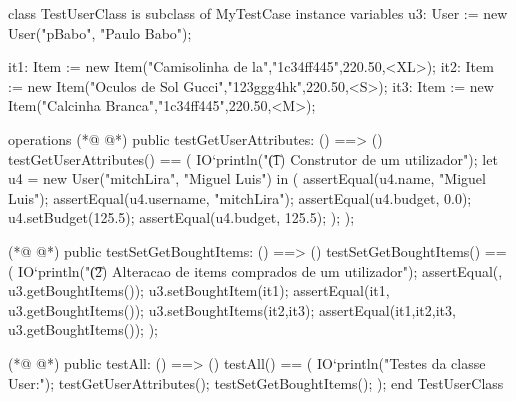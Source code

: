 \begin{vdmpp}[breaklines=true]
class TestUserClass is subclass of MyTestCase
 instance variables
  u3: User := new User("pBabo", "Paulo Babo");
  
  it1: Item := new Item("Camisolinha de la","1c34ff445",220.50,<XL>);
  it2: Item := new Item("Oculos de Sol Gucci","123ggg4hk",220.50,<S>);
  it3: Item := new Item("Calcinha Branca","1c34ff445",220.50,<M>);
  
 operations
(*@
\label{testGetUserAttributes:10}
@*)
  public testGetUserAttributes: () ==> ()
   testGetUserAttributes() == (
     IO`println("\t (1) Construtor de um utilizador");
    let u4 = new User("mitchLira", "Miguel Luis") in (
     assertEqual(u4.name, "Miguel Luis");
     assertEqual(u4.username, "mitchLira");
     assertEqual(u4.budget, 0.0);
     u4.setBudget(125.5);
     assertEqual(u4.budget, 125.5);
    );
  ); 
  
   
(*@
\label{testSetGetBoughtItems:23}
@*)
  public testSetGetBoughtItems: () ==> ()
   testSetGetBoughtItems() == (
     IO`println("\t (2) Alteracao de items comprados de um utilizador");
    assertEqual({}, u3.getBoughtItems());
    u3.setBoughtItem(it1);
    assertEqual({it1}, u3.getBoughtItems());
    u3.setBoughtItems({it2,it3});
    assertEqual({it1,it2,it3}, u3.getBoughtItems());
   );
  
(*@
\label{testAll:33}
@*)
  public testAll: () ==> ()
   testAll() == (
   IO`println("Testes da classe User:");
    testGetUserAttributes();
    testSetGetBoughtItems();
   );
end TestUserClass
\end{vdmpp}
